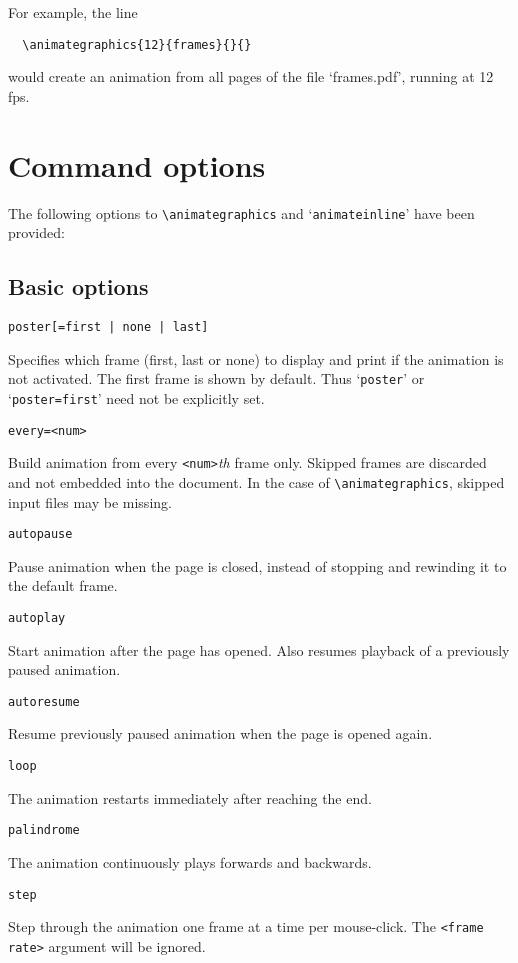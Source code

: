 \documentclass[a4paper]{article}
\begin{document}
For example, the line
\begin{verbatim}
  \animategraphics{12}{frames}{}{}
\end{verbatim}
would create an animation from all pages of the file `frames.pdf', running at 12 fps.

\section{Command options}
The following options to \verb+\animategraphics+ and `\verb+animateinline+' have been provided:
\subsection{Basic options}
\begin{verbatim}
poster[=first | none | last]
\end{verbatim}
Specifies which frame (first, last or none) to display and print if the animation is not activated. The first frame is shown by default. Thus `\verb+poster+' or `\verb+poster=first+' need not be explicitly set.
\begin{verbatim}
every=<num>
\end{verbatim}
Build animation from every \verb+<num>+\emph{th} frame only. Skipped frames are discarded and not embedded into the document. In the case of \verb+\animategraphics+, skipped input files may be missing.
\begin{verbatim}
autopause
\end{verbatim}
Pause animation when the page is closed, instead of stopping and rewinding it to the default frame.
\begin{verbatim}
autoplay
\end{verbatim}
Start animation after the page has opened. Also resumes playback of a previously paused animation.
\begin{verbatim}
autoresume
\end{verbatim}
Resume previously paused animation when the page is opened again.
\begin{verbatim}
loop
\end{verbatim}
The animation restarts immediately after reaching the end.
\begin{verbatim}
palindrome
\end{verbatim}
The animation continuously plays forwards and backwards.
\begin{verbatim}
step
\end{verbatim}
Step through the animation one frame at a time per mouse-click. The \verb+<frame rate>+ argument will be ignored.
\end{document}
